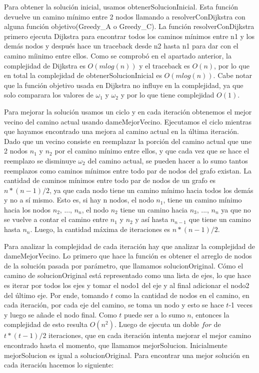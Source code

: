 Para obtener la solución inicial, usamos obtenerSolucionInicial. Esta función devuelve un camino mínimo entre 2 nodos llamando a resolverConDijkstra con alguna función objetivo(Greedy\_A o Greedy\_C). La función resolverConDijkstra primero ejecuta Dijkstra para encontrar todos los caminos mínimos entre n1 y los demás nodos y después hace un traceback desde n2 hasta n1 para dar con el camino míinimo entre ellos. Como se comprobó en el apartado anterior, la complejidad de Dijkstra es $O(m log(n))$ y el traceback es $O(n)$, por lo que en total la complejidad de obtenerSolucionInicial es $O(m log(n))$. Cabe notar que la función objetivo usada en Dijkstra no influye en la complejidad, ya que solo comparara los valores de $\omega_1$ y $\omega_2$ y por lo que tiene complejidad $O(1)$.

Para mejorar la solución usamos un ciclo y en cada iteración obtenemos el mejor vecino del camino actual usando dameMejorVecino. Ejecutamos el ciclo mientras que hayamos encontrado una mejora al camino actual en la última iteración. 
Dado que un vecino consiste en reemplazar la porción del camino actual que une 2 nodos $n_1$ y $n_2$ por el camino mínimo entre ellos, y que cada vez que se hace el reemplazo se disminuye $\omega_2$ del camino actual, se pueden hacer a lo sumo tantos reemplazos como caminos mínimos entre todo par de nodos del grafo existan. 
La cantidad de caminos mínimos entre todo par de nodos de un grafo es $n * (n-1) / 2$, ya que cada nodo tiene un camino mínimo hacia todos los demás y no a sí mismo. Esto es, si hay n nodos, el nodo $n_1$, tiene un camino mínimo hacia los nodos $n_2$, ..., $n_n$, el nodo $n_2$ tiene un camino hacia $n_3$, ..., $n_n$ ya que no se vuelve a contar el camino entre $n_1$ y $n_2$ y así hasta $n_{n-1}$ que tiene un camino hasta $n_n$.
Luego, la cantidad máxima de iteraciones es $n * (n-1) / 2$.

Para analizar la complejidad de cada iteración hay que analizar la complejidad de dameMejorVecino. 
Lo primero que hace la función es obtener el arreglo de nodos de la solución pasada por parámetro, que llamamos solucionOriginal. Cómo el camino de solucionOriginal está representado como una lista de ejes, lo que hace es iterar por todos los ejes y tomar el nodo1 del eje y al final adicionar el nodo2 del último eje. Por ende, tomando $t$ como la cantidad de nodos en el camino, en cada iteración, por cada eje del camino, se toma un nodo y esto se hace $t$-1 veces y luego se añade el nodo final. Como $t$ puede ser a lo sumo $n$, entonces la complejidad de esto resulta $O(n^2)$.
Luego de ejecuta un doble $for$ de $t * (t-1) / 2$ iteraciones, que en cada iteración intenta mejorar el mejor camino encontrado hasta el momento, que llamamos mejorSolucion. Inicialmente mejorSolucion es igual a solucionOriginal. 
Para encontrar una mejor solución en cada iteración hacemos lo siguiente:

